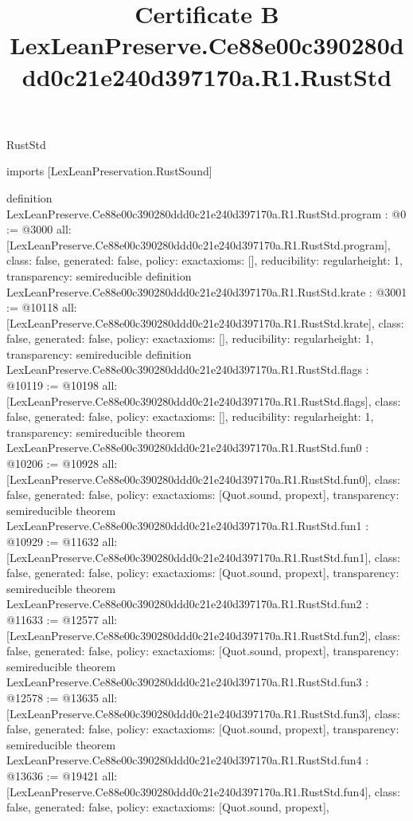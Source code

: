 \begin{lexlean}{RustStd}
\title{Certificate B LexLeanPreserve.Ce88e00c390280ddd0c21e240d397170a.R1.RustStd}
\begin{coremodule}
imports [LexLeanPreservation.RustSound]

definition LexLeanPreserve.Ce88e00c390280ddd0c21e240d397170a.R1.RustStd.program : @0 := @3000 {
  all: [LexLeanPreserve.Ce88e00c390280ddd0c21e240d397170a.R1.RustStd.program],
  class: false,
  generated: false,
  policy: exact{axioms: []},
  reducibility: regular{height: 1},
  transparency: semireducible
}
definition LexLeanPreserve.Ce88e00c390280ddd0c21e240d397170a.R1.RustStd.krate : @3001 := @10118 {
  all: [LexLeanPreserve.Ce88e00c390280ddd0c21e240d397170a.R1.RustStd.krate],
  class: false,
  generated: false,
  policy: exact{axioms: []},
  reducibility: regular{height: 1},
  transparency: semireducible
}
definition LexLeanPreserve.Ce88e00c390280ddd0c21e240d397170a.R1.RustStd.flags : @10119 := @10198 {
  all: [LexLeanPreserve.Ce88e00c390280ddd0c21e240d397170a.R1.RustStd.flags],
  class: false,
  generated: false,
  policy: exact{axioms: []},
  reducibility: regular{height: 1},
  transparency: semireducible
}
theorem LexLeanPreserve.Ce88e00c390280ddd0c21e240d397170a.R1.RustStd.fun0 : @10206 := @10928 {
  all: [LexLeanPreserve.Ce88e00c390280ddd0c21e240d397170a.R1.RustStd.fun0],
  class: false,
  generated: false,
  policy: exact{axioms: [Quot.sound, propext]},
  transparency: semireducible
}
theorem LexLeanPreserve.Ce88e00c390280ddd0c21e240d397170a.R1.RustStd.fun1 : @10929 := @11632 {
  all: [LexLeanPreserve.Ce88e00c390280ddd0c21e240d397170a.R1.RustStd.fun1],
  class: false,
  generated: false,
  policy: exact{axioms: [Quot.sound, propext]},
  transparency: semireducible
}
theorem LexLeanPreserve.Ce88e00c390280ddd0c21e240d397170a.R1.RustStd.fun2 : @11633 := @12577 {
  all: [LexLeanPreserve.Ce88e00c390280ddd0c21e240d397170a.R1.RustStd.fun2],
  class: false,
  generated: false,
  policy: exact{axioms: [Quot.sound, propext]},
  transparency: semireducible
}
theorem LexLeanPreserve.Ce88e00c390280ddd0c21e240d397170a.R1.RustStd.fun3 : @12578 := @13635 {
  all: [LexLeanPreserve.Ce88e00c390280ddd0c21e240d397170a.R1.RustStd.fun3],
  class: false,
  generated: false,
  policy: exact{axioms: [Quot.sound, propext]},
  transparency: semireducible
}
theorem LexLeanPreserve.Ce88e00c390280ddd0c21e240d397170a.R1.RustStd.fun4 : @13636 := @19421 {
  all: [LexLeanPreserve.Ce88e00c390280ddd0c21e240d397170a.R1.RustStd.fun4],
  class: false,
  generated: false,
  policy: exact{axioms: [Quot.sound, propext]},
}
\end{coremodule}
\end{lexlean}
